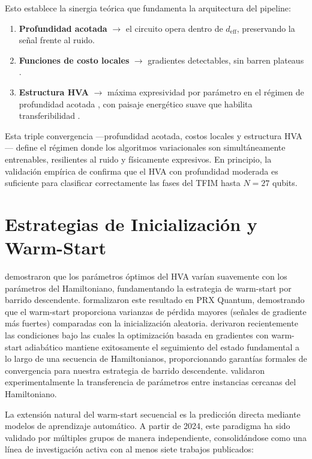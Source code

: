\documentclass[11pt,a4paper,spanish]{book}
\begin{document}
Esto establece la sinergia teórica que fundamenta la arquitectura del pipeline:
\begin{enumerate}
    \item \textbf{Profundidad acotada} $\to$ el circuito opera dentro de $d_{\text{eff}}$, preservando la señal frente al ruido.
    \item \textbf{Funciones de costo locales} $\to$ gradientes detectables, sin barren plateaus \citep{cerezo2021}.
    \item \textbf{Estructura HVA} $\to$ máxima expresividad por parámetro en el régimen de profundidad acotada \citep{wiersema2020}, con paisaje energético suave que habilita transferibilidad \citep{mele2022}.
\end{enumerate}

\noindent Esta triple convergencia ---profundidad acotada, costos locales y estructura HVA--- define el régimen donde los algoritmos variacionales son simultáneamente entrenables, resilientes al ruido y físicamente expresivos. En principio, la validación empírica de \citet{tripathi2026} confirma que el HVA con profundidad moderada es suficiente para clasificar correctamente las fases del TFIM hasta $N = 27$ qubits.

\section{Estrategias de Inicialización y Warm-Start}

\citet{mele2022} demostraron que los parámetros óptimos del HVA varían suavemente con los parámetros del Hamiltoniano, fundamentando la estrategia de warm-start por barrido descendente. \citet{puig2025} formalizaron este resultado en PRX Quantum, demostrando que el warm-start proporciona varianzas de pérdida mayores (señales de gradiente más fuertes) comparadas con la inicialización aleatoria. \citet{schiffer2026} derivaron recientemente las condiciones bajo las cuales la optimización basada en gradientes con warm-start adiabático mantiene exitosamente el seguimiento del estado fundamental a lo largo de una secuencia de Hamiltonianos, proporcionando garantías formales de convergencia para nuestra estrategia de barrido descendente. \citet{skogh2023} validaron experimentalmente la transferencia de parámetros entre instancias cercanas del Hamiltoniano.

La extensión natural del warm-start secuencial es la predicción directa mediante modelos de aprendizaje automático. A partir de 2024, este paradigma ha sido validado por múltiples grupos de manera independiente, consolidándose como una línea de investigación activa con al menos siete trabajos publicados:
\end{document}
